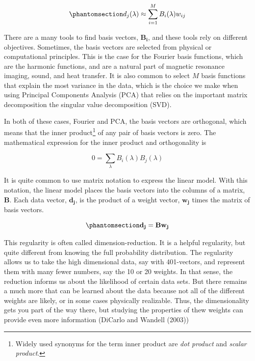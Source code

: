\documentclass[
  letterpaper,
]{book}
\begin{document}
\begin{equation}\phantomsection\label{eq-linear1}{
d_j(\lambda) \approx \sum_{i=1}^{M} B_i(\lambda) w_{ij}
}\end{equation}

There are a many tools to find basis vectors, \(\mathbf{B_i}\), and
these tools rely on different objectives. Sometimes, the basis vectors
are selected from physical or computational principles. This is the case
for the Fourier basis functions, which are the harmonic functions, and
are a natural part of magnetic resonance imaging, sound, and heat
transfer. It is also common to select \(M\) basis functions that explain
the most variance in the data, which is the choice we make when using
Principal Components Analysis (PCA) that relies on the important matrix
decomposition the singular value decomposition (SVD).

In both of these cases, Fourier and PCA, the basis vectors are
orthogonal, which means that the inner product\footnote{Widely used
  synonyms for the term inner product are \emph{dot product} and
  \emph{scalar product}.} of any pair of basis vectors is zero. The
mathematical expression for the inner product and orthogonality is

\[
0 = \sum_{\lambda} B_i(\lambda) B_j(\lambda)
\]

It is quite common to use matrix notation to express the linear model.
With this notation, the linear model places the basis vectors into the
columns of a matrix, \(\mathbf{B}\). Each data vector, \(\mathbf{d_j}\),
is the product of a weight vector, \(\mathbf{w_j}\) times the matrix of
basis vectors.

\begin{equation}\phantomsection\label{eq-linearmatrix}{
\mathbf{d_j} = \mathbf{B} \mathbf{w_j}
}\end{equation}

This regularity is often called dimension-reduction. It is a helpful
regularity, but quite different from knowing the full probability
distribution. The regularity allows us to take the high dimensional
data, say with 401-vectors, and represent them with many fewer numbers,
say the 10 or 20 weights. In that sense, the reduction informs us about
the likelihood of certain data sets. But there remains a much more that
can be learned about the data because not all of the different weights
are likely, or in some cases physically realizable. Thus, the
dimensionality gets you part of the way there, but studying the
properties of thew weights can provide even more information (DiCarlo
and Wandell (2003))
\end{document}
